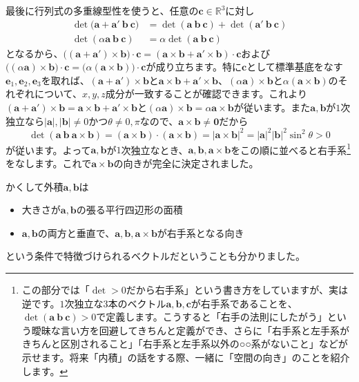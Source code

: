 最後に行列式の多重線型性を使うと、任意の$\bm{c} \in \mathbb{R}^3$に対し
\begin{align*}
\det\bigl(\bm{a} + \bm{a}'  \ \bm{b} \ \bm{c}\bigr) &= \det(\bm{a} \ \bm{b} \ \bm{c}) + \det(\bm{a}' \ \bm{b} \ \bm{c}) \\
\det(\alpha \bm{a} \ \bm{b} \ \bm{c}) &= \alpha \det(\bm{a} \ \bm{b} \ \bm{c})
\end{align*}
となるから、$\bigl((\bm{a} + \bm{a}') \times \bm{b}\bigr) \cdot \bm{c} = (\bm{a} \times \bm{b} + \bm{a}' \times \bm{b}) \cdot \bm{c}$および$\bigl((\alpha \bm{a}) \times \bm{b}\bigr) \cdot \bm{c} = \bigl(\alpha (\bm{a} \times \bm{b})\bigr) \cdot \bm{c}$が成り立ちます。特に$\bm{c}$として標準基底をなす$\bm{e}_1, \bm{e}_2, \bm{e}_3$を取れば、$(\bm{a} + \bm{a}') \times \bm{b}$と$\bm{a} \times \bm{b} + \bm{a}' \times \bm{b}$、$(\alpha \bm{a}) \times \bm{b}$と$\alpha(\bm{a} \times \bm{b})$のそれぞれについて、$x, y, z$成分が一致することが確認できます。これより$(\bm{a} + \bm{a}') \times \bm{b} = \bm{a} \times \bm{b} + \bm{a}' \times \bm{b}$と$(\alpha \bm{a}) \times \bm{b} = \alpha \bm{a} \times \bm{b}$が従います。また$\bm{a}, \bm{b}$が$1$次独立なら$|\bm{a}|, |\bm{b}| \neq 0$かつ$\theta \neq 0, \pi$なので、$\bm{a} \times \bm{b} \neq \bm{0}$だから
\[
\det (\bm{a} \ \bm{b} \ \bm{a} \times \bm{b}) = (\bm{a} \times \bm{b})\cdot (\bm{a} \times \bm{b}) = |\bm{a} \times \bm{b}|^2 = |\bm{a}|^2 |\bm{b}|^2 \sin^2 \theta > 0
\]
が従います。よって$\bm{a}, \bm{b}$が$1$次独立なとき、$\bm{a}, \bm{b}, \bm{a} \times \bm{b}$をこの順に並べると右手系\footnote{この部分では「$\det > 0$だから右手系」という書き方をしていますが、実は逆です。$1$次独立な$3$本のベクトル$\bm{a}, \bm{b}, \bm{c}$が右手系であることを、$\det(\bm{a} \ \bm{b} \ \bm{c}) > 0$で定義します。こうすると「右手の法則にしたがう」という曖昧な言い方を回避してきちんと定義ができ、さらに「右手系と左手系がきちんと区別されること」「右手系と左手系以外の○○系がないこと」などが示せます。将来「内積」の話をする際、一緒に「空間の向き」のことを紹介します。}をなします。これで$\bm{a} \times \bm{b}$の向きが完全に決定されました。

かくして外積$\bm{a}, \bm{b}$は
\begin{itemize}
\item 大きさが$\bm{a}, \bm{b}$の張る平行四辺形の面積
\item $\bm{a}, \bm{b}$の両方と垂直で、$\bm{a}, \bm{b}, \bm{a} \times \bm{b}$が右手系となる向き
\end{itemize}
という条件で特徴づけられるベクトルだということも分かりました。

